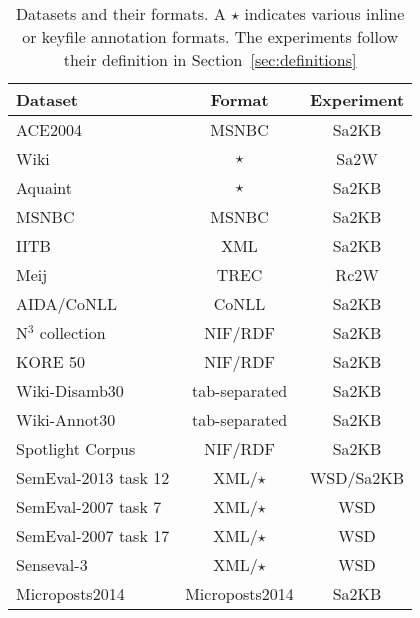
\begin{table}[tb!]
\centering
\begin{tabular}{lcc}
\toprule
\textbf{Dataset}                 & \textbf{Format}    & \textbf{Experiment}\\
\toprule
ACE2004                 & MSNBC     & Sa2KB\\
Wiki                    & $\star$   & Sa2W \\
Aquaint                 & $\star$   & Sa2KB\\
MSNBC                   & MSNBC     & Sa2KB\\
IITB                    & XML       & Sa2KB\\
Meij                    & TREC      & Rc2W \\
AIDA/CoNLL              & CoNLL     & Sa2KB \\
N$^3$ collection        & NIF/RDF   & Sa2KB \\
KORE 50                 & NIF/RDF   & Sa2KB \\
Wiki-Disamb30           & tab-separated & Sa2KB \\
Wiki-Annot30            & tab-separated & Sa2KB \\
Spotlight Corpus        & NIF/RDF   & Sa2KB \\
SemEval-2013 task 12    & XML/$\star$&WSD/Sa2KB\\
SemEval-2007 task 7     & XML/$\star$&WSD\\
SemEval-2007 task 17    & XML/$\star$&WSD\\
Senseval-3              & XML/$\star$&WSD\\
Microposts2014          & Microposts2014 & Sa2KB\\
\bottomrule
\end{tabular}
\caption{Datasets and their formats. A $\star$ indicates various inline or keyfile annotation formats. The experiments follow their definition in Section~\ref{sec:definitions}}
\label{tab:datasetformats}
\end{table}